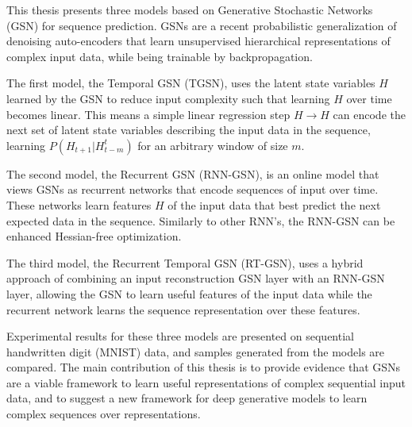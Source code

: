 This thesis presents three models based on Generative Stochastic Networks (GSN) for sequence prediction. GSNs are a recent probabilistic generalization of denoising auto-encoders that learn unsupervised hierarchical representations of complex input data, while being trainable by backpropagation.

The first model, the Temporal GSN (TGSN), uses the latent state variables \(H\) learned by the GSN to reduce input complexity such that learning \(H\) over time becomes linear. This means a simple linear regression step \(H \rightarrow H\) can encode the next set of latent state variables describing the input data in the sequence, learning \(P(H_{t+1}|H_{t-m}^t)\) for an arbitrary window of size \(m\).

The second model, the Recurrent GSN (RNN-GSN), is an online model that views GSNs as recurrent networks that encode sequences of input over time. These networks learn features \(H\) of the input data that best predict the next expected data in the sequence. Similarly to other RNN's, the RNN-GSN can be enhanced Hessian-free optimization.

The third model, the Recurrent Temporal GSN (RT-GSN), uses a hybrid approach of combining an input reconstruction GSN layer with an RNN-GSN layer, allowing the GSN to learn useful features of the input data while the recurrent network learns the sequence representation over these features.

Experimental results for these three models are presented on sequential handwritten digit (MNIST) data, and samples generated from the models are compared. The main contribution of this thesis is to provide evidence that GSNs are a viable framework to learn useful representations of complex sequential input data, and to suggest a new framework for deep generative models to learn complex sequences over representations.